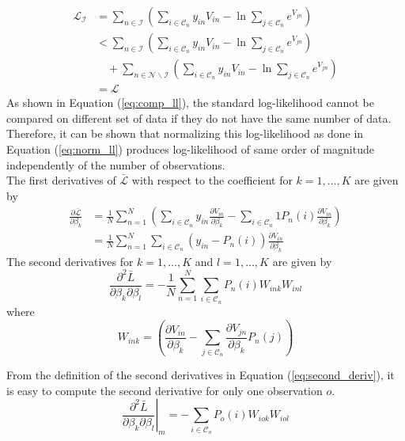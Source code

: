 \documentclass[conference]{IEEEtran}
\begin{document}
\begin{align}
\label{eq:comp_ll}
\mathcal{L}_{\mathcal{I}} &=  \sum_{n\in \mathcal{I}} \left( \sum_{i\in\mathcal{C}_n} y_{in}V_{in} - \ln \sum_{j\in\mathcal{C}_n}e^{V_{jn}} \right) \nonumber \\
&< \sum_{n\in \mathcal{I}} \left( \sum_{i\in\mathcal{C}_n} y_{in}V_{in} - \ln \sum_{j\in\mathcal{C}_n}e^{V_{jn}} \right) \nonumber \\ &\quad + \sum_{n \in \mathcal{N} \smallsetminus \mathcal{I}} \left( \sum_{i\in\mathcal{C}_n} y_{in}V_{in} - \ln \sum_{j\in\mathcal{C}_n}e^{V_{jn}} \right) \nonumber \\
&= \mathcal{L}
\end{align}
As shown in Equation (\ref{eq:comp_ll}), the standard log-likelihood cannot be compared on different set of data if they do not have the same number of data. Therefore, it can be shown that normalizing this log-likelihood as done in Equation (\ref{eq:norm_ll}) produces log-likelihood of same order of magnitude independently of the number of observations.\\

The first derivatives of $\bar{\mathcal{L}}$ with respect to the coefficient for $k=1,\ldots,K$ are given by
\begin{align}
\frac{\partial \bar{\mathcal{L}}}{\partial \beta_k} &= \frac{1}{N} \sum_{n=1}^N \left(\sum_{i\in\mathcal{C}_n} y_{in}\frac{\partial V_{in}}{\partial \beta_k} - \sum_{i\in\mathcal{C}_n}1 P_n(i) \frac{\partial V_{in}}{\partial \beta_k}\right) \nonumber \\
&= \frac{1}{N}\sum_{n=1}^N \sum_{i\in\mathcal{C}_n} \left(y_{in} - P_n(i)\right) \frac{\partial V_{in}}{\partial \beta_k} 
\end{align}
The second derivatives for $k=1,\ldots,K$ and $l=1,\ldots,K$ are given by
\begin{equation}
\label{eq:second_deriv}
\frac{\partial^2 \bar{L}}{\partial \beta_k \partial \beta_l} = - \frac{1}{N}\sum_{n=1}^N \sum_{i\in\mathcal{C}_n} P_n(i) W_{ink} W_{inl}
\end{equation}
where 
\[
W_{ink} = \left(\frac{\partial V_{in}}{\partial \beta_k} - \sum_{j\in\mathcal{C}_n} \frac{\partial V_{jn}}{\partial \beta_k}P_n(j)\right)
\]

From the definition of the second derivatives in Equation (\ref{eq:second_deriv}), it is easy to compute the second derivative for only one observation $o$.
\begin{equation}
\label{eq:second_deriv_1}
\left.\frac{\partial^2 \bar{L}}{\partial \beta_k \partial \beta_l}\right|_{m} = - \sum_{i\in\mathcal{C}_o} P_o(i) W_{iok} W_{iol}
\end{equation}
\end{document}
